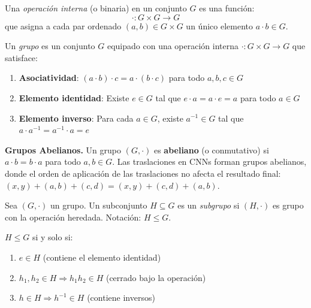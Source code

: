 \begin{definition}\label{def:operacion_interna}
Una \textit{operación interna} (o binaria) en un conjunto $G$ es una función:
\begin{equation}
\cdot: G \times G \rightarrow G
\end{equation}
que asigna a cada par ordenado $(a,b) \in G \times G$ un único elemento $a \cdot b \in G$.
\end{definition}

\begin{definition}[Grupo]\label{def:grupo}
Un \textit{grupo} es un conjunto $G$ equipado con una operación interna $\cdot: G \times G \rightarrow G$ que satisface:
\begin{enumerate}
    \item \textbf{Asociatividad}: $(a \cdot b) \cdot c = a \cdot (b \cdot c)$ para todo $a, b, c \in G$
    \item \textbf{Elemento identidad}: Existe $e \in G$ tal que $e \cdot a = a \cdot e = a$ para todo $a \in G$
    \item \textbf{Elemento inverso}: Para cada $a \in G$, existe $a^{-1} \in G$ tal que $a \cdot a^{-1} = a^{-1} \cdot a = e$
\end{enumerate}
\end{definition}

\textbf{Grupos Abelianos.}\label{rem:grupos_abelianos} Un grupo $(G, \cdot)$ es \textbf{abeliano} (o conmutativo) si $a \cdot b = b \cdot a$ para todo $a, b \in G$. Las traslaciones en \glspl{CNN} forman grupos abelianos, donde el orden de aplicación de las traslaciones no afecta el resultado final: $(x,y) + (a,b) + (c,d) = (x,y) + (c,d) + (a,b)$.

\begin{definition}[Subgrupo]\label{def:subgrupo}
Sea $(G, \cdot)$ un grupo. Un subconjunto $H \subseteq G$ es un \textit{subgrupo} si $(H, \cdot)$ es grupo con la operación heredada. Notación: $H \leq G$.
\end{definition}

\begin{proposition}\label{prop:criterio_subgrupo}
$H \leq G$ si y solo si:
\begin{enumerate}
    \item $e \in H$ (contiene el elemento identidad)
    \item $h_1, h_2 \in H \Rightarrow h_1 h_2 \in H$ (cerrado bajo la operación)
    \item $h \in H \Rightarrow h^{-1} \in H$ (contiene inversos)
\end{enumerate}
\end{proposition}

